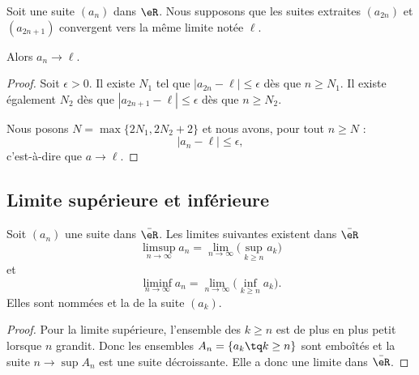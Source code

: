 \begin{proposition}      \label{PROPooXOOCooGMqJNe}
    Soit une suite \( (a_n)\) dans \( \eR\).  Nous supposons que les suites extraites \( (a_{2n})\) et \( (a_{2n+1})\) convergent vers la même limite notée \( \ell\).

    Alors \( a_n\to \ell\).
\end{proposition}

\begin{proof}
    Soit \( \epsilon>0\). Il existe \( N_1\) tel que \( | a_{2n}-\ell |\leq \epsilon\) dès que \( n\geq N_1\). Il existe également \( N_2\) dès que \( | a_{2n+1}-\ell |\leq \epsilon\) dès que \( n\geq N_2\).

    Nous posons \( N=\max\{ 2N_1,2N_2+2 \}\) et nous avons, pour tout \( n\geq N\) :
    \begin{equation}
        | a_n-\ell |\leq \epsilon,
    \end{equation}
    c'est-à-dire que \( a\to \ell\).
\end{proof}

\subsection{Limite supérieure et inférieure}

\begin{lemmaDef}      \label{ooMVZAooVVCOnP}
    Soit \( (a_n)\) une suite dans \( \bar \eR\). Les limites suivantes existent dans \( \bar \eR\)
    \begin{equation}
        \limsup_{n\to\infty}a_n=\lim_{n\to \infty}\big( \sup_{k\geq n}a_k \big)
    \end{equation}
    et
    \begin{equation}
        \liminf_{n\to \infty}a_n=\lim_{n\to\infty}\big( \inf_{k\geq n}a_k \big).
    \end{equation}
    Elles sont nommées  et la  de la suite \( (a_k)\).
\end{lemmaDef}

\begin{proof}
    Pour la limite supérieure, l'ensemble des \( k\geq n\) est de plus en plus petit lorsque \( n\) grandit. Donc les ensembles \( A_n=\{ a_k\tq k\geq n \}\) sont emboîtés et la suite \( n\to \sup A_n\) est une suite décroissante. Elle a donc une limite dans \( \bar \eR\).
\end{proof}

